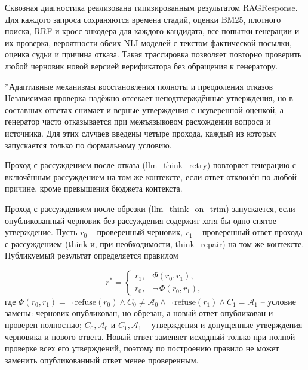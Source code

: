\documentclass[14pt,a4paper]{extarticle}
\makeatletter
\renewcommand\subsection{\@startsection{subsection}{2}{\z@}{8pt plus 2pt}{4pt}{\normalfont\normalsize\bfseries\itshape\raggedright}}
\makeatother
\begin{document}
Сквозная диагностика реализована типизированным результатом RAGResponse. Для каждого запроса сохраняются времена стадий, оценки BM25, плотного поиска, RRF и кросс-энкодера для каждого кандидата, все попытки генерации и их проверка, вероятности обеих NLI-моделей с текстом фактической посылки, оценка судьи и причина отказа. Такая трассировка позволяет повторно проверить любой черновик новой версией верификатора без обращения к генератору.

\subsection*{Адаптивные механизмы восстановления полноты и преодоления отказов}
Независимая проверка надёжно отсекает неподтверждённые утверждения, но в составных ответах снимает и верные утверждения с неуверенной оценкой, а генератор часто отказывается при межъязыковом расхождении вопроса и источника. Для этих случаев введены четыре прохода, каждый из которых запускается только по формальному условию.

Проход с рассуждением после отказа (llm\_think\_retry) повторяет генерацию с включённым рассуждением на том же контексте, если ответ отклонён по любой причине, кроме превышения бюджета контекста.

Проход с рассуждением после обрезки (llm\_think\_on\_trim) запускается, если опубликованный черновик без рассуждения содержит хотя бы одно снятое утверждение. Пусть $r_0$ – проверенный черновик, $r_1$ – проверенный ответ прохода с рассуждением (think и, при необходимости, think\_repair) на том же контексте. Публикуемый результат определяется правилом

\begin{equation}
r^{*} = \begin{cases} r_1, & \Phi(r_0, r_1), \\ r_0, & \neg\, \Phi(r_0, r_1), \end{cases}
\tag{9}
\end{equation}
\noindent где $\Phi(r_0, r_1) = \neg\, \mathrm{refuse}(r_0) \wedge C_0 \ne \mathcal{A}_0 \wedge \neg\, \mathrm{refuse}(r_1) \wedge C_1 = \mathcal{A}_1$ – условие замены: черновик опубликован, но обрезан, а новый ответ опубликован и проверен полностью; $C_0, \mathcal{A}_0$ и $C_1, \mathcal{A}_1$ – утверждения и допущенные утверждения черновика и нового ответа. Новый ответ заменяет исходный только при полной проверке всех его утверждений, поэтому по построению правило не может заменить опубликованный ответ менее проверенным.
\end{document}
